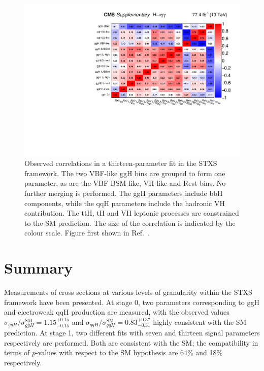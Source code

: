 \begin{figure}[hptb]
  \centering
  \includegraphics[width=\textwidth]{Figures/Results/CorrStage1Min.pdf}
  \caption[Observed correlations in a thirteen-parameter fit in the STXS framework.]
  {
    Observed correlations in a thirteen-parameter fit in the STXS framework. 
    The two VBF-like ggH bins are grouped to form one parameter, 
    as are the VBF BSM-like, VH-like and Rest bins. 
    No further merging is performed. 
    The ggH parameters include bbH components,
    while the qqH parameters include the hadronic VH contribution. 
    The ttH, tH and VH leptonic processes are constrained to the SM prediction. 
    The size of the correlation is indicated by the colour scale.
    Figure first shown in Ref.~\cite{HIG-18-029}.
  }
  \label{fig:results_CorrStage1Min}
\end{figure}

\section{Summary}

Measurements of cross sections at various levels of granularity within the STXS framework 
have been presented.
At stage 0, two parameters corresponding to ggH and electroweak qqH production are measured, 
with the observed values $\sigma_{ggH}/\sigma_{ggH}^{\textrm{SM}} = 1.15_{-0.15}^{+0.15}$ 
and $\sigma_{qqH}/\sigma_{qqH}^{\textrm{SM}} = 0.83_{-0.31}^{+0.37}$ 
highly consistent with the SM prediction.
At stage 1, two different fits with seven and thirteen signal parameters respectively are performed.
Both are consistent with the SM; the compatibility in terms of $p$-values with respect to the SM
hypothesis are 64\% and 18\% respectively.

